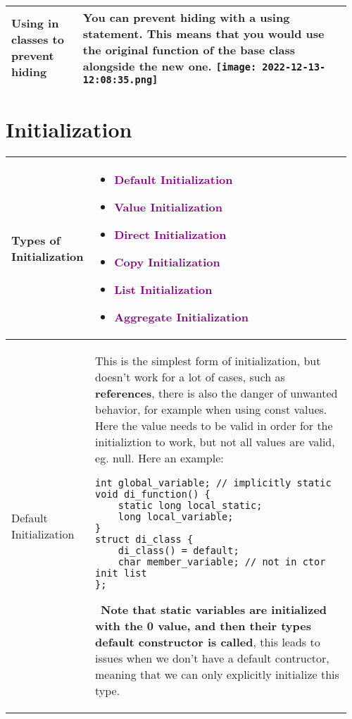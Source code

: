 \documentclass[main.tex,fontsize=8pt,paper=a4,paper=portrait,DIV=calc,]{scrartcl}
\begin{document}
\begin{table}[ht!]
\begin{tabular}{|m{0.2\linewidth}|m{0.755\linewidth}|}
\hline
Using in classes to prevent hiding & 
You can prevent hiding with a \textbf{using} statement.\newline
This means that you would use the original function of the base class alongside the new one.\newline
\texttt{[image: 2022-12-13-12:08:35.png]}\\
\hline
\end{tabular}
\section{Initialization}
\begin{tabular}{|m{0.2\linewidth}|m{0.755\linewidth}|}
\hline
Types of Initialization & 
\vspace{2mm}
\begin{itemize}
\item \textcolor{purple}{Default Initialization}
\item \textcolor{purple}{Value Initialization}
\item \textcolor{purple}{Direct Initialization}
\item \textcolor{purple}{Copy Initialization}
\item \textcolor{purple}{List Initialization}
\item \textcolor{purple}{Aggregate Initialization}
\vspace{-3mm}
\end{itemize} 
\\
\hline
Default Initialization & 
This is the simplest form of initialization, but doesn't work for a lot of cases, such as \textbf{references}, there is also the danger of unwanted behavior, for example when using const values. Here the value needs to be valid in order for the initializtion to work, but not all values are valid, eg. null.\newline 
Here an example:\newline 
\begin{lstlisting}
int global_variable; // implicitly static
void di_function() {
    static long local_static;
    long local_variable;
}
struct di_class {
    di_class() = default;
    char member_variable; // not in ctor init list
};
\end{lstlisting}
\, \newline
\textbf{Note that static variables are initialized with the 0 value, and then their types default constructor is called}, this leads to issues when we don't have a default contructor, meaning that we can only explicitly initialize this type.\newline 

\end{tabular}
\end{table}
\end{document}
